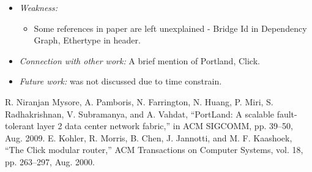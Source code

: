 \documentclass[letterpaper,twocolumn,10pt]{article}
\begin{document}
\begin{itemize}
\item {\it Weakness:} 
\begin{itemize}
\item Some references in paper are left unexplained - Bridge Id in Dependency Graph, Ethertype in header.

\end{itemize}


\item {\it Connection with other work:} 
A brief mention of Portland\cite{Portland}, Click\cite{Click}.

\item {\it Future work:} was not discussed due to time constrain.

\end{itemize}

\begin{thebibliography}{1}
 R. Niranjan Mysore, A. Pamboris, N. Farrington, N. Huang, P. Miri, S. Radhakrishnan, V. Subramanya, and A. Vahdat, “PortLand: A scalable fault-tolerant layer 2 data center network fabric,” in ACM SIGCOMM, pp. 39–50, Aug. 2009.
 E. Kohler, R. Morris, B. Chen, J. Jannotti, and M. F. Kaashoek, “The Click modular router,” ACM Transactions on Computer Systems, vol. 18, pp. 263–297, Aug. 2000.

\end{thebibliography}
\end{document}
